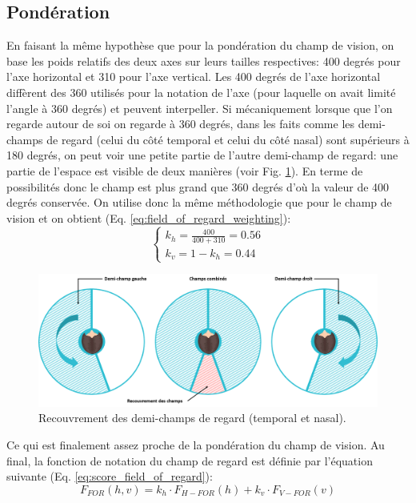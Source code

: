 	\subsection{Pondération}
	\par En faisant la même hypothèse que pour la pondération du champ de vision, on base les poids relatifs des deux axes sur leurs tailles respectives: 400 degrés pour l'axe horizontal et 310 pour l'axe vertical. Les 400 degrés de l'axe horizontal diffèrent des 360 utilisés pour la notation de l'axe (pour laquelle on avait limité l'angle à 360 degrés) et peuvent interpeller. Si mécaniquement lorsque que l'on regarde autour de soi on regarde à 360 degrés, dans les faits comme les demi-champs de regard (celui du côté temporal et celui du côté nasal) sont supérieurs à 180 degrés, on peut voir une petite partie de l'autre demi-champ de regard: une partie de l'espace est visible de deux manières (voir Fig. \ref{fig:demi_champs_regard}). En terme de possibilités donc le champ est plus grand que 360 degrés d'où la valeur de 400 degrés conservée. On utilise donc la même méthodologie que pour le champ de vision et on obtient (Eq. \ref{eq:field_of_regard_weighting}):
	\begin{equation}
	\begin{cases}
		k_h = \frac{400}{400 + 310} = 0.56\\
		k_v = 1 - k_h = 0.44
	\end{cases}
	\label{eq:field_of_regard_weighting}
	\end{equation}
	
	\begin{figure}[h]
		\centering
		\includegraphics[scale=.35]{Figures/RecouvrementFOR}
		\caption{Recouvrement des demi-champs de regard (temporal et nasal).}
		\label{fig:demi_champs_regard}
	\end{figure}
	
	\par Ce qui est finalement assez proche de la pondération du champ de vision. Au final, la fonction de notation du champ de regard est définie par l'équation suivante (Eq. \ref{eq:score_field_of_regard}):
	\begin{equation}
	F_{FOR}(h,v) = k_h \cdot F_{H-FOR}(h) + k_v \cdot F_{V-FOR}(v)
	\label{eq:score_field_of_regard}
	\end{equation}
	
